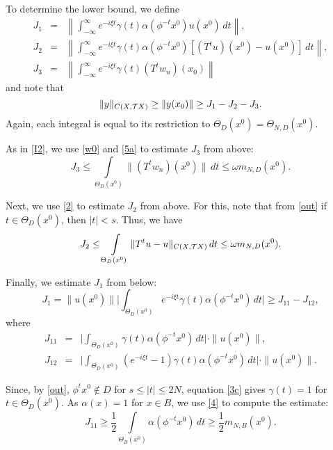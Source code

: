 \begin{pf}
To determine  the lower bound, we define
\begin{eqnarray*}
J_1 &=& \left\| \int^{\infty}_{-\infty}
e^{-i\xi t} \gamma (t) \alpha(\phi^{-t}x^0)
u(x^0) \,dt\right\|, \\
J_2 &=& \left\| \int^{\infty}_{-\infty}
e^{-i\xi t} \gamma (t) \alpha(\phi^{-t}x^0)
\left[ (T^tu)(x^0)-u(x^0)\right] \,dt \right\|, \\
J_3 &=& \left\|\int^{\infty}_{-\infty} e^{-i\xi t} \gamma (t)
(T^tw_n)(x_0)\right\|
\end{eqnarray*}
and note that
$$ \|y\|_{C(X,{{\cal{T}}X})}\ge \|y(x_0)\|  \geq
 J_1  - J_2 - J_3.$$
Again, each integral is equal to its restriction to
$\Theta_D(x^0)=\Theta_{N,D}(x^0)$.

As in \eqref{I2}, we use \eqref{w0} and \eqref{5a}
to estimate $J_3$ from above:
\begin{equation}\label{J3}
J_3 \leq
\int\limits_{\Theta_D(x^0)}\|(T^tw_n)(x^0)\| \,dt
\leq \omega m_{N,D}(x^0).
\end{equation}

Next, we use \eqref{2} to estimate $J_2$ from above. For this,
note that from \eqref{out} if $t\in \Theta_D(x^0)$, then $|t|<s$. Thus,
we have
\begin{equation}\label{J2}
J_2\leq
\int\limits_{\Theta_D(x^0)}\|T^tu-u\|_{C(X,{{\cal{T}}X})} \,dt\leq
\omega m_{N,D}(x^0).
\end{equation}

Finally, we  estimate $J_1$ from below:
\begin{equation}\label{J1}
J_1=  \|u(x^0)\| \Big|
\int_{\Theta_D(x^0)}
e^{-i\xi t}\gamma (t)
\alpha(\phi^{-t}x^0)\,dt \Big|
\ge J_{11} - J_{12},
\end{equation}
where
\begin{eqnarray*}
J_{11} &=& \big|
\int_{\Theta_D(x^0)}
\gamma (t)\alpha(\phi^{-t}x^0)\,dt
\big|\cdot \|u(x^0)\|, \\
J_{12} &=& \big|
\int_{\Theta_D(x^0)}(e^{-i\xi t}
-1)\gamma (t)\alpha(\phi^{-t}x^0)\,dt \big|
\cdot \|u(x^0)\|.
\end{eqnarray*}

Since, by \eqref{out}, $\phi^tx^0\not\in D$ for $s\le |t|\le 2N$,
equation \eqref{3c} gives $\gamma(t)=1$ for $t\in \Theta_D(x^0)$.
As $\alpha (x)=1$ for $x\in B$, we use \eqref{4} to compute
the estimate:
\begin{equation}\label{J11}
J_{11}\ge \dfrac12 \int\limits_{\Theta_B(x^0)}
\alpha(\phi^{-t}x^0) \,dt \ge
\dfrac12 m_{N,B}(x^0).
\end{equation}


\end{pf}
